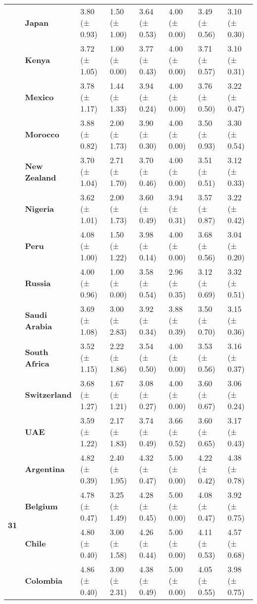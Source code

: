 \begin{tabular}{llllllll}
\textbf{} & \textbf{Japan} & 3.80 (± 0.93) & 1.50 (± 1.00) & 3.64 (± 0.53) & 4.00 (± 0.00) & 3.49 (± 0.56) & 3.10 (± 0.30) \\
\textbf{} & \textbf{Kenya} & 3.72 (± 1.05) & 1.00 (± 0.00) & 3.77 (± 0.43) & 4.00 (± 0.00) & 3.71 (± 0.57) & 3.10 (± 0.31) \\
\textbf{} & \textbf{Mexico} & 3.78 (± 1.17) & 1.44 (± 1.33) & 3.94 (± 0.24) & 4.00 (± 0.00) & 3.76 (± 0.50) & 3.22 (± 0.47) \\
\textbf{} & \textbf{Morocco} & 3.88 (± 0.82) & 2.00 (± 1.73) & 3.90 (± 0.30) & 4.00 (± 0.00) & 3.50 (± 0.93) & 3.30 (± 0.54) \\
\textbf{} & \textbf{New Zealand} & 3.70 (± 1.04) & 2.71 (± 1.70) & 3.70 (± 0.46) & 4.00 (± 0.00) & 3.51 (± 0.51) & 3.12 (± 0.33) \\
\textbf{} & \textbf{Nigeria} & 3.62 (± 1.01) & 2.00 (± 1.73) & 3.60 (± 0.49) & 3.94 (± 0.31) & 3.57 (± 0.87) & 3.22 (± 0.42) \\
\textbf{} & \textbf{Peru} & 4.08 (± 1.00) & 1.50 (± 1.22) & 3.98 (± 0.14) & 4.00 (± 0.00) & 3.68 (± 0.56) & 3.04 (± 0.20) \\
\textbf{} & \textbf{Russia} & 4.00 (± 0.96) & 1.00 (± 0.00) & 3.58 (± 0.54) & 2.96 (± 0.35) & 3.12 (± 0.69) & 3.32 (± 0.51) \\
\textbf{} & \textbf{Saudi Arabia} & 3.69 (± 1.08) & 3.00 (± 2.83) & 3.92 (± 0.34) & 3.88 (± 0.39) & 3.50 (± 0.70) & 3.15 (± 0.36) \\
\textbf{} & \textbf{South Africa} & 3.52 (± 1.15) & 2.22 (± 1.86) & 3.54 (± 0.50) & 4.00 (± 0.00) & 3.53 (± 0.56) & 3.16 (± 0.37) \\
\textbf{} & \textbf{Switzerland} & 3.68 (± 1.27) & 1.67 (± 1.21) & 3.08 (± 0.27) & 4.00 (± 0.00) & 3.60 (± 0.67) & 3.06 (± 0.24) \\
\textbf{} & \textbf{UAE} & 3.59 (± 1.22) & 2.17 (± 1.83) & 3.74 (± 0.49) & 3.66 (± 0.52) & 3.60 (± 0.65) & 3.17 (± 0.43) \\
\cline{1-8}
\multirow[t]{19}{*}{\textbf{31}} & \textbf{Argentina} & 4.82 (± 0.39) & 2.40 (± 1.95) & 4.32 (± 0.47) & 5.00 (± 0.00) & 4.22 (± 0.42) & 4.38 (± 0.78) \\
\textbf{} & \textbf{Belgium} & 4.78 (± 0.47) & 3.25 (± 1.49) & 4.28 (± 0.45) & 5.00 (± 0.00) & 4.08 (± 0.47) & 3.92 (± 0.75) \\
\textbf{} & \textbf{Chile} & 4.80 (± 0.40) & 3.00 (± 1.58) & 4.26 (± 0.44) & 5.00 (± 0.00) & 4.11 (± 0.53) & 4.57 (± 0.68) \\
\textbf{} & \textbf{Colombia} & 4.86 (± 0.40) & 3.00 (± 2.31) & 4.38 (± 0.49) & 5.00 (± 0.00) & 4.05 (± 0.55) & 3.98 (± 0.75) \\

\end{tabular}
